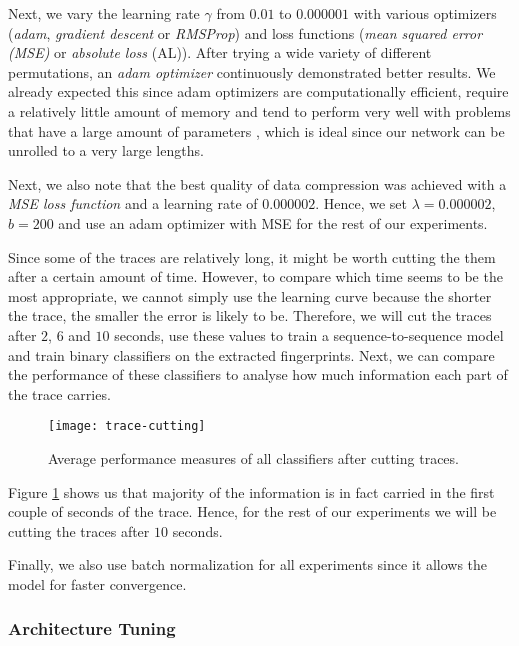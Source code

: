 Next, we vary the learning rate $\gamma$ from $0.01$ to $0.000001$ with various optimizers (\textit{adam}, \textit{gradient descent} or \textit{RMSProp}) and loss functions (\textit{mean squared error (MSE)} or \textit{absolute loss} (AL)).
After trying a wide variety of different permutations, an \textit{adam optimizer} continuously demonstrated better results.
We already expected this since adam optimizers are computationally efficient, require a relatively little amount of memory and tend to perform very well with problems that have a large amount of parameters \cite{kingma2014adam},
which is ideal since our network can be unrolled to a very large lengths.

Next, we also note that the best quality of data compression was achieved with a \textit{MSE loss function} and a learning rate of $0.000002$.
Hence, we set $\lambda = 0.000002$, $b = 200$ and use an adam optimizer with MSE for the rest of our experiments.

Since some of the traces are relatively long, it might be worth cutting the them after a certain amount of time.
However, to compare which time seems to be the most appropriate, we cannot simply use the learning curve because the shorter the trace, the smaller the error is likely to be.
Therefore, we will cut the traces after $2$, $6$ and $10$ seconds, use these values to train a sequence-to-sequence model and train binary classifiers on the extracted fingerprints.
Next, we can compare the performance of these classifiers to analyse how much information each part of the trace carries.

\begin{figure}[ht]
  \centering
  \texttt{[image: trace-cutting]}
  \caption{Average performance measures of all classifiers after cutting traces.}
  \label{fig:trace-cutting}
\end{figure}

Figure \ref{fig:trace-cutting} shows us that majority of the information is in fact carried in the first couple of seconds of the trace.
Hence, for the rest of our experiments we will be cutting the traces after $10$ seconds.

Finally, we also use batch normalization for all experiments since it allows the model for faster convergence.

\subsubsection{Architecture Tuning}

